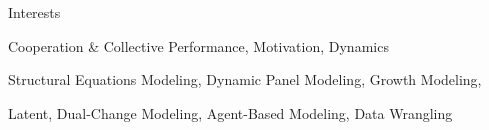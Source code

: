 
\begin{rubric}{Interests}


	
	
\entry*[Research]
	Cooperation \& Collective Performance, Motivation, Dynamics
	
	Structural Equations Modeling, Dynamic Panel Modeling, Growth Modeling,\par
	Latent, Dual-Change Modeling, Agent-Based Modeling, Data Wrangling
					
\end{rubric}
